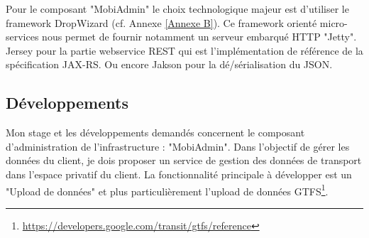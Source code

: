 Pour le composant "MobiAdmin" le choix technologique majeur est d'utiliser le framework DropWizard (cf. Annexe \ref{Annexe B}). Ce framework orienté micro-services nous permet de fournir notamment un serveur embarqué HTTP "Jetty". Jersey pour la partie webservice REST qui est l'implémentation de référence de la spécification JAX-RS. Ou encore Jakson pour la dé/sérialisation du JSON.\\


\subsection{Développements}

Mon stage et les développements demandés concernent le composant d'administration de l'infrastructure : "MobiAdmin". Dans l'objectif de gérer les données du client, je dois proposer un service de gestion des données de transport dans l’espace privatif du client.
La fonctionnalité principale à développer est un "Upload de données" et plus particulièrement l'upload de données GTFS\footnote{\url{https://developers.google.com/transit/gtfs/reference}}.\\ 

